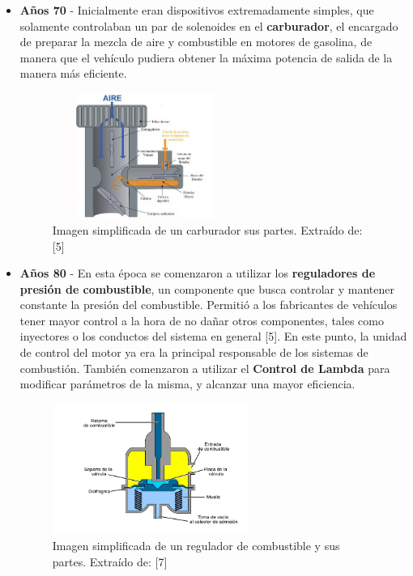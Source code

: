 \begin{itemize}

    \item \textbf{Años 70} - Inicialmente eran dispositivos extremadamente simples, que solamente controlaban un par de solenoides en el \textbf{carburador}, el encargado de preparar la mezcla de aire y combustible en motores de gasolina, de manera que el vehículo pudiera obtener la máxima potencia de salida de la manera más eficiente.

    \begin{figure}[h]
        \centering
        \includegraphics[width=0.5\textwidth]{imagenes/esquema_carburador.png}
        \caption{Imagen simplificada de un carburador sus partes. Extraído de: [5]}
    \end{figure}
 
    \item \textbf{Años 80} - En esta época se comenzaron a utilizar los \textbf{reguladores de presión de combustible}, un componente que busca controlar y mantener constante la presión del combustible. Permitió a los fabricantes de vehículos tener mayor control a la hora de no dañar otros componentes, tales como inyectores o los conductos del sistema en general [5]. En este punto, la unidad de control del motor ya era la principal responsable de los sistemas de combustión. También comenzaron a utilizar el \textbf{Control de Lambda} para modificar parámetros de la misma, y alcanzar una mayor eficiencia.

    \begin{figure}[h]
        \centering
        \includegraphics[width=0.6\textwidth]{imagenes/esquema_rpc.png}
        \caption{Imagen simplificada de un regulador de combustible y sus partes. Extraído de: [7]}
    \end{figure}



\end{itemize}
